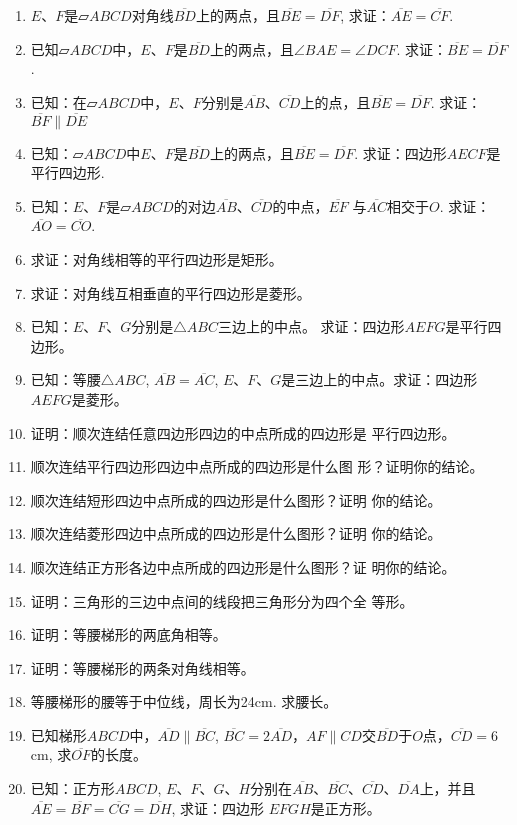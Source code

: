 \begin{ex}
\begin{enumerate}
    \item $E$、$F$是$\parallelogram ABCD$对角线$\overline{BD}$上的两点，且$\overline{BE}=\overline{DF}$,  求证：$\overline{AE}=\overline{CF}$.
    \item 已知$\parallelogram ABCD$中，$E$、$F$是$\overline{BD}$上的两点，且$\angle BAE=\angle DCF$.  求证：$\overline{BE}=\overline{DF}$.
\item 已知：在$\parallelogram ABCD$中，$E$、$F$分别是$\overline{AB}$、$\overline{CD}$上的点，且$\overline{BE}=\overline{DF}$. 求证：$\overline{BF}\parallel\overline{DE}$

\item 已知：$\parallelogram ABCD$中$E$、$F$是$\overline{BD}$上的两点，且$\overline{BE}=\overline{DF}$. 求证：四边形$AECF$是平行四边形.
\item 已知：$E$、$F$是$\parallelogram ABCD$的对边$\overline{AB}$、$\overline{CD}$的中点，$\overline{EF}$
与$\overline{AC}$相交于$O$. 求证：$\overline{AO}=\overline{CO}$.
\item 求证：对角线相等的平行四边形是矩形。
\item 求证：对角线互相垂直的平行四边形是菱形。
\item 已知：$E$、$F$、$G$分别是$\triangle ABC$三边上的中点。
求证：四边形$AEFG$是平行四边形。
\item 已知：等腰$\triangle ABC$, $\overline{AB}=\overline{AC}$, $E$、$F$、$G$是三边上的中点。求证：四边形$AEFG$是菱形。
    
\item 证明：顺次连结任意四边形四边的中点所成的四边形是
平行四边形。
\item 顺次连结平行四边形四边中点所成的四边形是什么图
形？证明你的结论。
\item 顺次连结短形四边中点所成的四边形是什么图形？证明
你的结论。
\item 顺次连结菱形四边中点所成的四边形是什么图形？证明
你的结论。
\item 顺次连结正方形各边中点所成的四边形是什么图形？证
明你的结论。
\item 证明：三角形的三边中点间的线段把三角形分为四个全
等形。
\item 证明：等腰梯形的两底角相等。
\item 证明：等腰梯形的两条对角线相等。
\item 等腰梯形的腰等于中位线，周长为24cm. 求腰长。
\item 已知梯形$ABCD$中，$\overline{AD}\parallel \overline{BC}$, $\overline{BC}=2\overline{AD}$，$AF\parallel CD$交$\overline{BD}$于$O$点，$\overline{CD}=6$cm, 求$\overline{OF}$的长度。

\item 已知：正方形$ABCD$, $E$、$F$、$G$、$H$分别在$\overline{AB}$、$\overline{BC}$、$\overline{CD}$、$\overline{DA}$上，并且$\overline{AE}=\overline{BF}=\overline{CG}=\overline{DH}$, 求证：四边形
$EFGH$是正方形。
\end{enumerate}
\end{ex}



